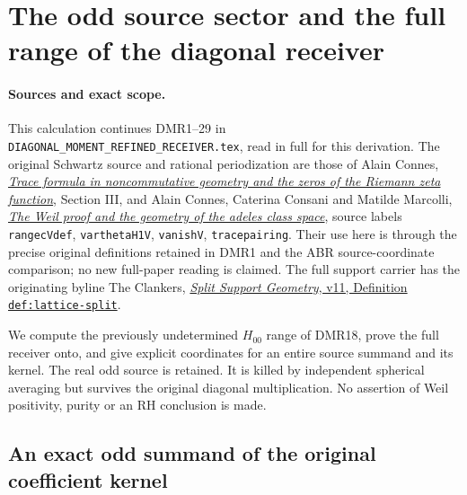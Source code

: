 \section{The odd source sector and the full range of the diagonal receiver}
\label{sec:diagonal-odd-sector-range}

\paragraph{Sources and exact scope.}
This calculation continues DMR1--29 in
\nolinkurl{DIAGONAL_MOMENT_REFINED_RECEIVER.tex}, read in full for this
derivation. The original Schwartz source and rational periodization are
those of Alain Connes,
\href{https://arxiv.org/abs/math/9811068v1}{\emph{Trace formula in
noncommutative geometry and the zeros of the Riemann zeta function}},
Section III, and Alain Connes, Caterina Consani and Matilde Marcolli,
\href{https://arxiv.org/abs/math/0703392v1}{\emph{The Weil proof and the
geometry of the adeles class space}}, source labels
\texttt{rangecVdef}, \texttt{varthetaH1V}, \texttt{vanishV},
\texttt{tracepairing}. Their use here is through the precise original
definitions retained in DMR1 and the ABR source-coordinate comparison;
no new full-paper reading is claimed. The full support carrier has the
originating byline The Clankers,
\href{https://github.com/KokunoYumeto/zeta-function-research-reader/blob/a2851f9eb352e7e4376bc629de86fa4ed9c1c434/workbenches/splitzero-tandem/foundations/split-support-geometry-v11/split_support_geometry_arithmetic_curve_v11.tex}{\emph{Split Support Geometry}, v11,
Definition \texttt{def:lattice-split}}.

We compute the previously undetermined $H_{00}$ range of DMR18,
prove the full receiver onto, and give explicit coordinates for an
entire source summand and its kernel. The real odd source is retained.
It is killed by independent spherical averaging but survives the
original diagonal multiplication. No assertion of Weil positivity,
purity or an RH conclusion is made.

\subsection{An exact odd summand of the original coefficient kernel}

